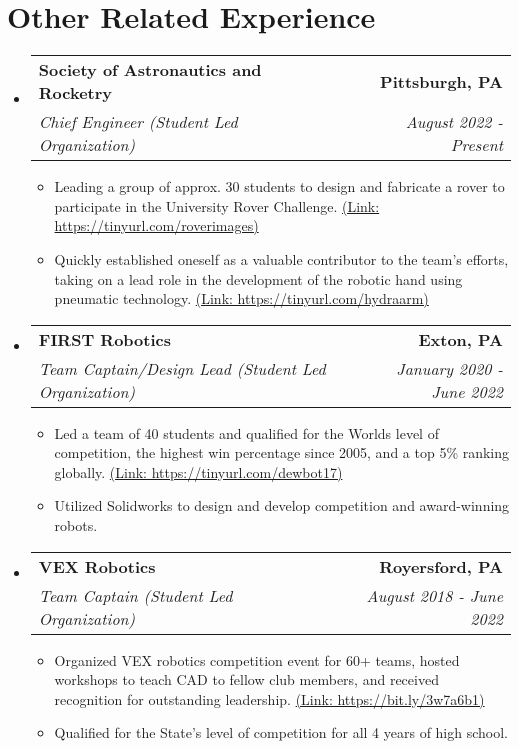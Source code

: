 \documentclass[letterpaper,10pt]{article}
\makeatletter
\newcommand{\resumeSubheading}[4]{
  \vspace{-1pt}\item
    \begin{tabular*}{0.97\textwidth}{l@{\extracolsep{\fill}}r}
      \textbf{#1} & \textbf{#2} \\
      \textit{#3} & \textit{#4} \\
    \end{tabular*}\vspace{-5pt}
}
\newcommand{\resumeSubHeadingListStart}{\begin{itemize}[leftmargin=*]}
\newcommand{\resumeSubHeadingListEnd}{\end{itemize}}
\newcommand{\resumeItemListStart}{\begin{itemize}}
\newcommand{\resumeItemListEnd}{\end{itemize}\vspace{-5pt}}
\makeatother
\begin{document}
\section{Other Related Experience}
    \resumeSubHeadingListStart
        \resumeSubheading
            {Society of Astronautics and Rocketry}{Pittsburgh, PA}
            {Chief Engineer (Student Led Organization)}{August 2022 -  Present}
            \resumeItemListStart
              \item Leading a group of approx. 30 students to design and fabricate a rover to participate in the University Rover Challenge. \href{https://tinyurl.com/roverimages}{(Link: https://tinyurl.com/roverimages)}
              \item Quickly established oneself as a valuable contributor to the team's efforts, taking on a lead role in the development of the robotic hand using pneumatic technology. \href{https://tinyurl.com/hydraarm}{(Link: https://tinyurl.com/hydraarm)}
            \resumeItemListEnd
\vspace{4pt}
        \resumeSubheading
            {FIRST Robotics}{Exton, PA}
            {Team Captain/Design Lead (Student Led Organization)}{January 2020 -  June 2022}
            \resumeItemListStart
                \item Led a team of 40 students and qualified for the Worlds level of competition, the highest win percentage since 2005, and a top 5\% ranking globally. \href{https://tinyurl.com/dewbot17}{(Link: https://tinyurl.com/dewbot17)}
                \item Utilized Solidworks to design and develop competition and award-winning robots.
            \resumeItemListEnd
\vspace{4pt}
        \resumeSubheading
            {VEX Robotics}{Royersford, PA}
            {Team Captain (Student Led Organization)}{August 2018 -  June 2022}
            \resumeItemListStart
              \item Organized VEX robotics competition event for 60+ teams, hosted workshops to teach CAD to fellow club members, and received recognition for outstanding leadership. \href{https://bit.ly/3w7a6b1}{(Link: https://bit.ly/3w7a6b1)}
              \item Qualified for the State's level of competition for all 4 years of high school.
            \resumeItemListEnd
    \resumeSubHeadingListEnd
\vspace{-5pt}

\end{document}
